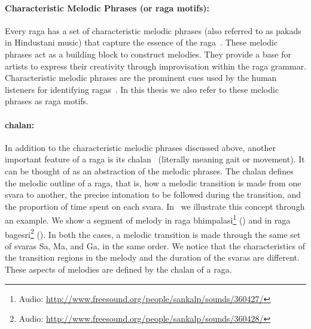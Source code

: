 \paragraph{Characteristic Melodic Phrases (or \gls{raga} motifs):} Every \gls{raga} has a set of characteristic melodic phrases (also referred to as pakads in Hindustani music) that capture the essence of the \gls{raga}~\citep{Bagchee1998,rao1999raga,Viswanathan2004}. These melodic phrases act as a building block to construct melodies. They provide a base for artists to express their creativity through improvisation within the \gls{raga} grammar. Characteristic melodic phrases are the prominent cues used by the human listeners for identifying \glspl{raga}~\citep{krishna2012carnatic,Suvarnalata2014}. In this thesis we also refer to these melodic phrases as \gls{raga} motifs.

\paragraph{\Gls{chalan}:} In addition to the characteristic melodic phrases discussed above, another important feature of a \gls{raga} is its \gls{chalan}~\citep{rao1999raga,Bagchee1998,Suvarnalata2014} (literally meaning gait or movement). It can be thought of as an abstraction of the melodic phrases. The \gls{chalan} defines the melodic outline of a \gls{raga}, that is, how a melodic transition is made from one \gls{svara} to another, the precise intonation to be followed during the transition, and the proportion of time spent on each \gls{svara}. In~ we illustrate this concept through an example. We show a segment of melody in \gls{raga} \gls{bhimpalasi}\footnote{Audio: \url{http://www.freesound.org/people/sankalp/sounds/360427/}} () and in \gls{raga} \gls{bagesri}\footnote{Audio: \url{http://www.freesound.org/people/sankalp/sounds/360428/}} ().  In both the cases, a melodic transition is made through the same set of \glspl{svara} Sa, Ma, and Ga, in the same order. We notice that the characteristics of the transition regions in the melody and the duration of the \glspl{svara} are different. These aspects of melodies are defined by the \gls{chalan} of a \gls{raga}.

